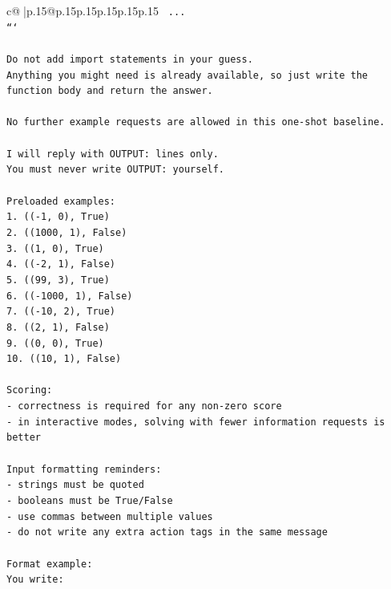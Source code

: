 \documentclass{article}
\begin{document}
{\begin{supertabular}{c@{$\;$}|p{.15\linewidth}@{}p{.15\linewidth}p{.15\linewidth}p{.15\linewidth}p{.15\linewidth}p{.15\linewidth}}
{{{\texttt{    ...} \\
\texttt{```} \\
\\ 
\texttt{Do not add import statements in your guess.} \\
\texttt{Anything you might need is already available, so just write the function body and return the answer.} \\
\\ 
\texttt{No further example requests are allowed in this one{-}shot baseline.} \\
\\ 
\texttt{I will reply with OUTPUT: lines only.} \\
\texttt{You must never write OUTPUT: yourself.} \\
\\ 
\texttt{Preloaded examples:} \\
\texttt{1. (({-}1, 0), True)} \\
\texttt{2. ((1000, 1), False)} \\
\texttt{3. ((1, 0), True)} \\
\texttt{4. (({-}2, 1), False)} \\
\texttt{5. ((99, 3), True)} \\
\texttt{6. (({-}1000, 1), False)} \\
\texttt{7. (({-}10, 2), True)} \\
\texttt{8. ((2, 1), False)} \\
\texttt{9. ((0, 0), True)} \\
\texttt{10. ((10, 1), False)} \\
\\ 
\texttt{Scoring:} \\
\texttt{{-} correctness is required for any non{-}zero score} \\
\texttt{{-} in interactive modes, solving with fewer information requests is better} \\
\\ 
\texttt{Input formatting reminders:} \\
\texttt{{-} strings must be quoted} \\
\texttt{{-} booleans must be True/False} \\
\texttt{{-} use commas between multiple values} \\
\texttt{{-} do not write any extra action tags in the same message} \\
\\ 
\texttt{Format example:} \\
\texttt{You write:} \\
}}}
\end{supertabular}}
\end{document}
